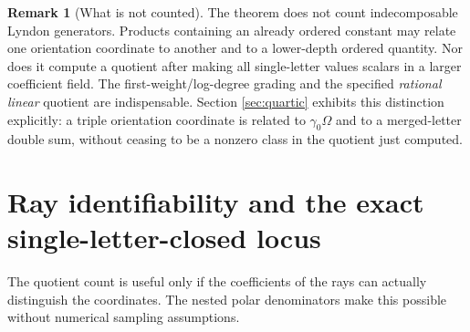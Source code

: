 \documentclass[11pt]{article}
\numberwithin{equation}{section}
\theoremstyle{definition}
\newtheorem{remark}[theorem]{Remark}
\begin{document}
\begin{remark}[What is not counted]\label{rem:not-module-rank}
The theorem does not count indecomposable Lyndon generators. Products
containing an already ordered constant may relate one orientation
coordinate to another and to a lower-depth ordered quantity. Nor does it
compute a quotient after making all single-letter values scalars in a
larger coefficient field. The first-weight/log-degree grading and the
specified \emph{rational linear} quotient are indispensable. Section
\ref{sec:quartic} exhibits this distinction explicitly: a triple
orientation coordinate is related to $\gamma_0\Omega$ and to a merged-letter
double sum, without ceasing to be a nonzero class in the quotient just
computed.
\end{remark}

\section{Ray identifiability and the exact single-letter-closed locus}
\label{sec:ray-geometry}
The quotient count is useful only if the coefficients of the rays can
actually distinguish the coordinates. The nested polar denominators make
this possible without numerical sampling assumptions.
\end{document}
